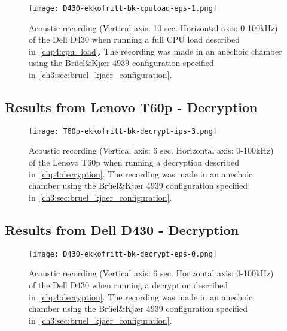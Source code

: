 \begin{figure}[ht]
    \centering
    \texttt{[image: D430-ekkofritt-bk-cpuload-eps-1.png]}
    \caption{Acoustic recording (Vertical axis: 10 sec. Horizontal axis: 0-100kHz) of the Dell D430 when running a full CPU load described in~\autoref{chp4:cpu_load}. The recording was made in an anechoic chamber using the Brüel\&Kjær 4939 configuration specified in~\autoref{ch3:sec:bruel_kjaer_configuration}. }
    \label{fig:D430-ekkofritt-bk-cpuload-eps-1}
\end{figure}


\subsection{Results from Lenovo T60p - Decryption}\label{subsec:t60p_bk_results_decryption}

\begin{figure}[ht]
    \centering
    \texttt{[image: T60p-ekkofritt-bk-decrypt-ips-3.png]}
    \caption{Acoustic recording (Vertical axis: 6 sec. Horizontal axis: 0-100kHz) of the Lenovo T60p when running a decryption described in~\autoref{chp4:decryption}. The recording was made in an anechoic chamber using the Brüel\&Kjær 4939 configuration specified in~\autoref{ch3:sec:bruel_kjaer_configuration}. }
    \label{fig:T60p-ekkofritt-bk-decrypt-ips-3}
\end{figure}

\subsection{Results from Dell D430 - Decryption}\label{subsec:d430_bk_results_cpuload}

\begin{figure}[ht]
    \centering
    \texttt{[image: D430-ekkofritt-bk-decrypt-eps-0.png]}
    \caption{Acoustic recording (Vertical axis: 6 sec. Horizontal axis: 0-100kHz) of the Dell D430 when running a decryption described in~\autoref{chp4:decryption}. The recording was made in an anechoic chamber using the Brüel\&Kjær 4939 configuration specified in~\autoref{ch3:sec:bruel_kjaer_configuration}.}
    \label{fig:D430-ekkofritt-bk-decrypt-eps-0}
\end{figure}


